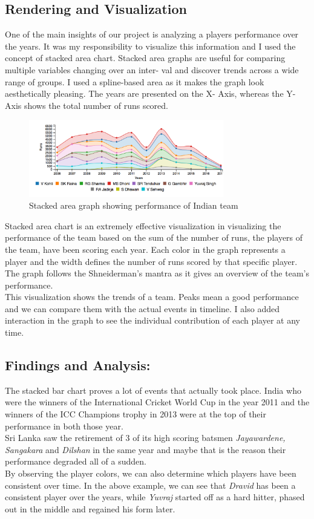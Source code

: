 \documentclass[letterpaper, 10 pt, conference]{ieeeconf}  %
\begin{document}
\subsection{Rendering and Visualization}
One of the main insights of our project is analyzing a players performance over the years. It was my responsibility to visualize this information and I used the concept of stacked area chart. Stacked area graphs are useful for comparing multiple variables changing over an inter- val and discover trends across a wide range of groups. I used a spline-based area as it makes the graph look aesthetically pleasing. The years are presented on the X- Axis, whereas the Y-Axis shows the total number of runs scored.
\begin{figure}[!ht]
\centering
\includegraphics[width= 8.5cm]{india_case3.png}
\caption{Stacked area graph showing performance of Indian team}
\end{figure}
Stacked area chart is an extremely effective visualization in visualizing the performance of the team based on the sum of the number of runs, the players of the team, have been scoring each year. Each color in the graph represents a player and the width defines the number of runs scored by that specific player. The graph follows the Shneiderman’s mantra\cite{mantra} as it gives an overview of the team’s performance.\\
\noindent This visualization shows the trends of a team. Peaks mean a good performance and we can compare them with the actual events in timeline.
\noindent I also added interaction in the graph to see the individual contribution of each player at any time.

\subsection{Findings and Analysis:}
The stacked bar chart proves a lot of events that actually took place. India who were the winners of the International Cricket World Cup in the year 2011 and the winners of the ICC Champions trophy in 2013 were at the top of their performance in both those year.\\
\noindent Sri Lanka saw the retirement of 3 of its high scoring batsmen \textit{Jayawardene, Sangakara} and \textit{Dilshan} in the same year and maybe that is the reason their performance degraded all of a sudden.\\
\noindent By observing the player colors, we can also determine which players have been consistent over time. In the above example, we can see that \textit{Dravid} has been a consistent player over the years, while \textit{Yuvraj} started off as a hard hitter, phased out in the middle and regained his form later.
\end{document}
